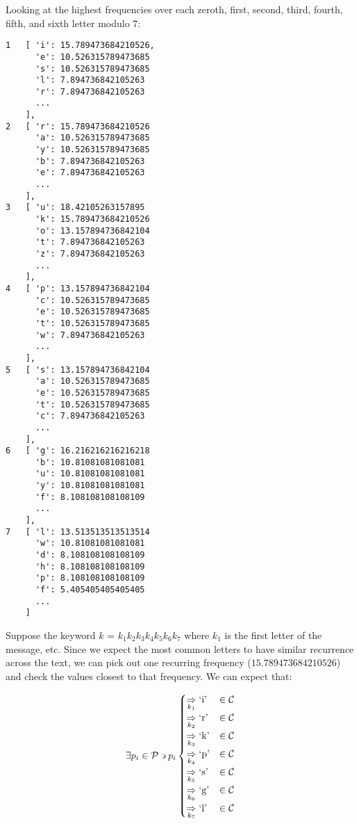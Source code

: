 \begin{Answer}
\noindent
Looking at the highest frequencies over each zeroth, first,
second, third, fourth, fifth, and sixth letter modulo $7$:
\begin{multicols*}{2}
\begin{Verbatim}[commandchars=\\\{\}]
1   [ 'i': 15.789473684210526,
      'e': 10.526315789473685
      's': 10.526315789473685
      'l': 7.894736842105263
      'r': 7.894736842105263
      ...
    ],
2   [ 'r': 15.789473684210526
      'a': 10.526315789473685
      'y': 10.526315789473685
      'b': 7.894736842105263
      'e': 7.894736842105263 
      ...
    ],
3   [ 'u': 18.42105263157895
      'k': 15.789473684210526
      'o': 13.157894736842104
      't': 7.894736842105263
      'z': 7.894736842105263
      ...
    ],
4   [ 'p': 13.157894736842104
      'c': 10.526315789473685
      'e': 10.526315789473685
      't': 10.526315789473685
      'w': 7.894736842105263
      ...
    ],
5   [ 's': 13.157894736842104
      'a': 10.526315789473685
      'e': 10.526315789473685
      't': 10.526315789473685
      'c': 7.894736842105263
      ...
    ],
6   [ 'g': 16.216216216216218
      'b': 10.81081081081081
      'u': 10.81081081081081
      'y': 10.81081081081081
      'f': 8.108108108108109
      ...
    ],
7   [ 'l': 13.513513513513514
      'w': 10.81081081081081
      'd': 8.108108108108109
      'h': 8.108108108108109
      'p': 8.108108108108109
      'f': 5.405405405405405
      ...
    ]
\end{Verbatim}
\end{multicols*}
\noindent
\noindent
Suppose the keyword $k$ = $k_{1}k_{2}k_{3}k_{4}k_{5}k_{6}k_{7}$
where $k_{1}$ is the first letter of the message, etc.
\newline
Since we expect the most common letters to have similar recurrence across the text,
we can pick out one recurring frequency ($15.789473684210526$) and check the values closest to that frequency.
\newline
We can expect that:

\begin{align*}
\exists p_{i} \in \mathcal{P} \backepsilon p_{i} \begin{cases}
  \underset{k_{1}}{\Rightarrow} \text{`i'} &\in \mathcal{C}\\
  \underset{k_{2}}{\Rightarrow} \text{`r'} &\in \mathcal{C}\\
  \underset{k_{3}}{\Rightarrow} \text{`k'} &\in \mathcal{C}\\
  \underset{k_{4}}{\Rightarrow} \text{`p'} &\in \mathcal{C}\\
  \underset{k_{5}}{\Rightarrow} \text{`s'} &\in \mathcal{C}\\
  \underset{k_{6}}{\Rightarrow} \text{`g'} &\in \mathcal{C}\\
  \underset{k_{7}}{\Rightarrow} \text{`l'} &\in \mathcal{C}
\end{cases} 
\end{align*}


\end{Answer}
